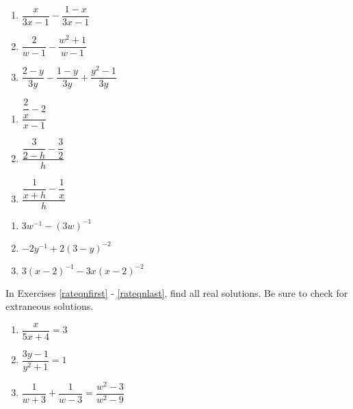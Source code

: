 \documentclass[10pt]{article}
\begin{document}
\begin{multicols}{3}
\begin{enumerate}
\setcounter{enumi}{\value{HW}}

\item  $\dfrac{x}{3x-1} - \dfrac{1-x}{3x-1}$
\item  $\dfrac{2}{w-1} - \dfrac{w^2+1}{w-1}$
\item  $\dfrac{2-y}{3y} - \dfrac{1-y}{3y} + \dfrac{y^2-1}{3y}$
 

\setcounter{HW}{\value{enumi}}
\end{enumerate}
\end{multicols}


\begin{multicols}{3}
\begin{enumerate}
\setcounter{enumi}{\value{HW}}

\item $\dfrac{\dfrac{2}{x} - 2}{x-1}$
\item $\dfrac{\dfrac{3}{2-h} - \dfrac{3}{2}}{h}$
\item $\dfrac{\dfrac{1}{x+h} - \dfrac{1}{x}}{h}$

\setcounter{HW}{\value{enumi}}
\end{enumerate}
\end{multicols}


\begin{multicols}{3}
\begin{enumerate}
\setcounter{enumi}{\value{HW}}

\item  $3w^{-1} - (3w)^{-1}$
\item  $-2y^{-1}  + 2(3-y)^{-2}$
\item  $3(x-2)^{-1} - 3x(x-2)^{-2}$\label{ratsimplast}

 
\setcounter{HW}{\value{enumi}}
\end{enumerate}
\end{multicols}

\vspace{-0.15in}

In Exercises \ref{rateqnfirst} - \ref{rateqnlast}, find all real solutions.  Be sure to check for extraneous solutions.

\begin{multicols}{3}
\begin{enumerate}
\setcounter{enumi}{\value{HW}}

\item $\dfrac{x}{5x + 4} = 3$ \label{rateqnfirst}
\item $\dfrac{3y - 1}{y^{2} + 1} = 1$
\item $\dfrac{1}{w + 3} + \dfrac{1}{w - 3} = \dfrac{w^{2} - 3}{w^{2} - 9}$

\setcounter{HW}{\value{enumi}}
\end{enumerate}
\end{multicols}
\end{document}
